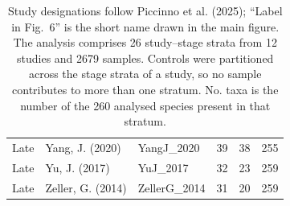 \begin{table}[H]
{\begin{tabular}{lllrrr}
Late & Yang, J. (2020) & YangJ\_2020 &  39 &  38 & 255 \\
Late & Yu, J. (2017) & YuJ\_2017 &  32 &  23 & 259 \\
Late & Zeller, G. (2014) & ZellerG\_2014 &  31 &  20 & 259 \\
\bottomrule
\end{tabular}
}
\caption*{\footnotesize Study designations follow Piccinno et al. (2025); ``Label in Fig.~6'' is the short name drawn in the main figure. The analysis comprises 26 study--stage strata from 12 studies and 2679 samples. Controls were partitioned across the stage strata of a study, so no sample contributes to more than one stratum. No. taxa is the number of the 260 analysed species present in that stratum.}
\end{table}
